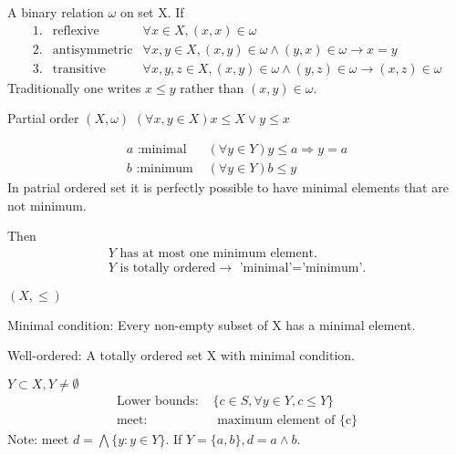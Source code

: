 \begin{Def}A binary relation $\omega$ on set X. If 
    \begin{align*}
        1. & \text{reflexive} & \forall x \in X,(x,x) \in \omega   \\
        2. & \text{antisymmetric} & \forall x,y\in X,(x,y)\in \omega \wedge (y,x)\in \omega \rightarrow x=y    \\
        3. & \text{transitive} & \forall x,y,z \in X, (x,y)\in \omega \wedge (y,z)\in \omega \rightarrow (x,z)\in \omega
    \end{align*}
    Traditionally one writes $x\leq y$ rather than $(x,y)\in \omega$.
\end{Def}
\begin{Def} Partial order $(X,\omega)$
    $(\forall x,y\in X)x\leq X \vee y\leq x$   
\end{Def}

\begin{Def}
    \begin{align*}
        a\text{ :minimal } & (\forall y\in Y)y\leq a \Rightarrow y=a   \\
        b\text{ :minimum } & (\forall y \in Y)b\leq y
    \end{align*}
    In patrial ordered set it is perfectly possible to have minimal elements that are not minimum.
\end{Def}

\begin{Prop}Then
    \begin{align*}
        Y \text{ has at most one minimum element.}  \\
        Y \text{ is totally ordered} \rightarrow \text{ 'minimal'='minimum'.}
    \end{align*}
\end{Prop}

\begin{Def} $(X,\leq)$

    Minimal condition: Every non-empty subset of X has a minimal element.

    Well-ordered: A totally ordered set X with minimal condition.
\end{Def}
\begin{Def}$Y\subset X, Y\neq \emptyset$
    \begin{align*}
        \text{Lower bounds: } & \{c\in S, \forall y\in Y, c\leq Y\}\\
        \text{meet: }   & \text{ maximum element of {\{c\}}}
    \end{align*}
    Note: meet $d=\bigwedge \{y:y\in Y\}$. If $Y=\{a,b\}, d=a\wedge b$.
\end{Def}

